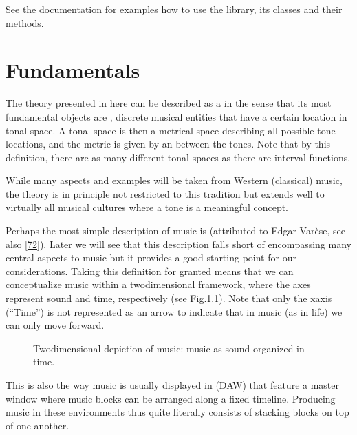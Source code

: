 \documentclass[letterpaper,10pt,english]{sphinxmanual}
\begin{document}
\sphinxAtStartPar
See the documentation {\hyperref[\detokenize{api:api}]{}} for examples how to use the library,
its classes and their methods.


\chapter{Fundamentals}
\label{\detokenize{1_fundamentals:fundamentals}}\label{\detokenize{1_fundamentals::doc}}
\sphinxAtStartPar
The theory presented in here can be described as a  in the sense
that its most fundamental objects are , discrete musical entities that have
a certain location in tonal space.
A tonal space is then a metrical space describing all possible tone locations,
and the metric is given by an  between the tones. Note that by this definition,
there are as many different tonal spaces as there are interval functions.

\sphinxAtStartPar
While many aspects and examples will be taken
from Western (classical) music, the theory is in principle not restricted to this
tradition but extends well to virtually all musical cultures where a tone is a meaningful concept.

\sphinxAtStartPar
Perhaps the most simple description of music is  (attributed to
Edgar Varèse, see also {[}\hyperlink{cite.8_bibliography:id41}{72}{]}).
Later we will see that this description falls short of encompassing many central aspects to music
but it provides a good starting point for our considerations. Taking this definition for granted
means that we can conceptualize music within a two\sphinxhyphen{}dimensional framework, where the axes
represent sound and time, respectively (see \hyperref[\detokenize{1_fundamentals:fig-soundtime}]{Fig.\@ \ref{\detokenize{1_fundamentals:fig-soundtime}}}). Note that only the x\sphinxhyphen{}axis (“Time”)
is not represented as an arrow to indicate that in music (as in life) we can only move forward.
\begin{figure}[htbp]\centering\capstart{}\caption{Two\sphinxhyphen{}dimensional depiction of music: music as sound organized in time.}\label{\detokenize{1_fundamentals:id7}}\label{\detokenize{1_fundamentals:fig-soundtime}}\end{figure}
\sphinxAtStartPar
This is also the way music is usually displayed in  (DAW) that feature
a master window where music blocks can be arranged along a fixed timeline. Producing music in
these environments thus quite literally consists of stacking blocks on top of one another.
\end{document}
